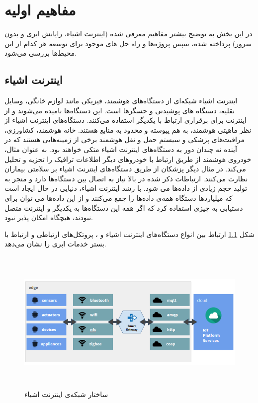 \chapter{مفاهیم اولیه‌}\label{chapter2}

در این بخش به توضیح بیشتر مفاهیم معرفی شده (اینترنت اشیاء، رایانش ابری و بدون سرور) پرداخته شده، سپس پروژه‌ها و راه حل های موجود برای توسعه هر کدام از این محیط‌ها بررسی می‌شود.

\section{اینترنت اشیاء}

اینترنت اشیاء شبکه‌ای از دستگاه‌های هوشمند، فیزیکی مانند لوازم خانگی، وسایل نقلیه، دستگاه های پوشیدنی و حسگرها است. این دستگاه‌ها  نامیده می‌شوند و از اینترنت برای برقراری ارتباط با یکدیگر استفاده می‌کنند. دستگاه‌های اینترنت اشیاء از نظر ماهیتی هوشمند، به هم پیوسته و محدود به منابع هستند. خانه هوشمند‌، کشاورزی‌، مراقبت‌های پزشکی‌ و سیستم حمل و نقل هوشمند برخی از زمینه‌هایی هستند که در آینده‌ نه چندان دور به دستگاه‌های اینترنت اشیاء متکی خواهند بود. به عنوان مثال، خودرو‌ی هوشمند از طریق ارتباط با خودروهای دیگر اطلاعات ترافیک را تجزیه و تحلیل می‌کند. در مثال دیگر پزشکان از طریق دستگاه‌های اینترنت اشیاء بر سلامتی بیماران نظارت می‌کنند. ارتباطات ذکر شده در بالا نیاز به اتصال بین دستگاه‌ها دارد و منجر به تولید حجم زیادی از داده‌ها می شود. با رشد اینترنت اشیاء، دنیایی در حال ایجاد است که میلیاردها دستگاه همه‌ی داده‌ها را جمع می‌کنند و از این داده‌ها می توان برای دستیابی به چیزی استفاده کرد که اگر همه این دستگاه‌ها به یکدیگر و اینترنت متصل نبودند، هیچگاه امکان پذیر نبود.

شکل \ref{IoT_explained} ارتباط بین انواع دستگاه‌های اینترنت اشیاء و ، پروتکل‌های ارتباطی و ارتباط با بستر خدمات ابری را نشان می‌دهد. 

\begin{figure}[!h]
	\centering
	\includegraphics[height=7cm]{images/IoT_explained}
	\caption{ساختار شبکه‌ی اینترنت اشیاء}
	\label{IoT_explained}
\end{figure}


